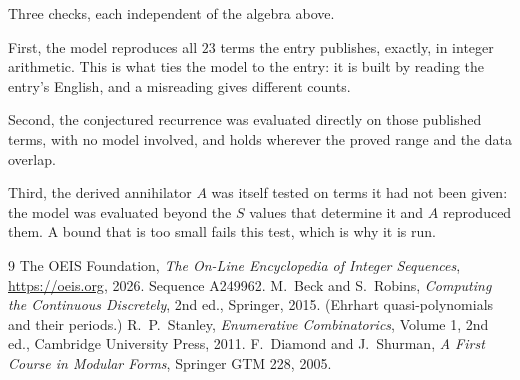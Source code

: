 \documentclass[11pt,a4paper]{article}
\theoremstyle{plain}
\theoremstyle{definition}
\begin{document}
Three checks, each independent of the algebra above.

First, the model reproduces all $23$ terms the entry publishes, exactly, in integer
arithmetic. This is what ties the model to the entry: it is built by reading the entry's
English, and a misreading gives different counts.

Second, the conjectured recurrence was evaluated directly on those published terms, with no
model involved, and holds wherever the proved range and the data overlap.

Third, the derived annihilator $A$ was itself tested on terms it had not been given: the model
was evaluated beyond the $S$ values that determine it and $A$ reproduced them. A bound that is
too small fails this test, which is why it is run.

\begin{thebibliography}{9}
 The OEIS Foundation, \emph{The On-Line Encyclopedia of Integer
Sequences}, \url{https://oeis.org}, 2026. Sequence A249962.
 M.~Beck and S.~Robins, \emph{Computing the Continuous Discretely},
2nd ed., Springer, 2015. (Ehrhart quasi-polynomials and their periods.)
 R.~P.~Stanley, \emph{Enumerative Combinatorics}, Volume 1, 2nd ed.,
Cambridge University Press, 2011.
 F.~Diamond and J.~Shurman, \emph{A First Course in Modular Forms},
Springer GTM 228, 2005.
\end{thebibliography}
\end{document}
